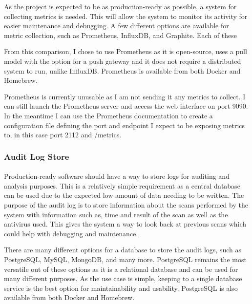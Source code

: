 \documentclass[12pt, conference, final, a4paper, onecolumn, compsoc]{IEEEtran}
\begin{document}
As the project is expected to be as production-ready as possible, a system for
collecting metrics is needed. This will allow the system to monitor its activity
for easier maintenance and debugging. A few different options are available for
metric collection, such as Prometheus, InfluxDB, and Graphite. Each of these


From this comparison, I chose to use Prometheus as it is open-source, uses a
pull model with the option for a push gateway and it does not require a
distributed system to run, unlike InfluxDB. Prometheus is available from both
Docker and Homebrew.

Prometheus is currently unusable as I am not sending it any metrics to collect.
I can still launch the Prometheus server and access the web interface on port
9090. In the meantime I can use the Prometheus documentation to create a
configuration file defining the port and endpoint I expect to be exposing
metrics to, in this case port 2112 and /metrics.


\subsubsection*{Audit Log Store}
\paragraph{}

Production-ready software should have a way to store logs for auditing and
analysis purposes. This is a relatively simple requirement as a central database
can be used due to the expected low amount of data needing to be written. The
purpose of the audit log is to store information about the scans performed by
the system with information such as, time and result of the scan as well as the
antivirus used. This gives the system a way to look back at previous scans which
could help with debugging and maintenance.

There are many different options for a database to store the audit logs, such as
PostgreSQL, MySQL, MongoDB, and many more. PostgreSQL remains the most versatile
out of these options as it is a relational database and can be used for many
different purposes. As the use case is simple, keeping to a single database
service is the best option for maintainability and usability. PostgreSQL is also
available from both Docker and Homebrew.
\end{document}
